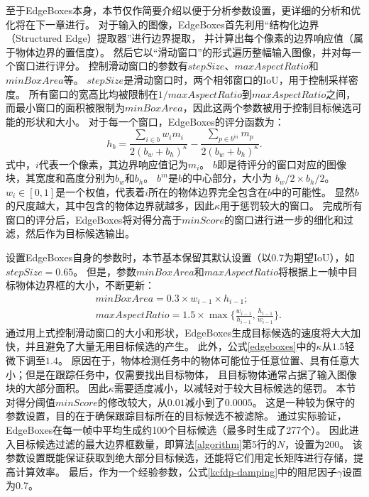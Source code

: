 至于EdgeBoxes本身，本节仅作简要介绍以便于分析参数设置，更详细的分析和优化将在下一章进行。
对于输入的图像，EdgeBoxes首先利用``结构化边界（Structured Edge）提取器''进行边界提取，
并计算出每个像素的边界响应值（属于物体边界的置信度）。
然后它以``滑动窗口''的形式遍历整幅输入图像，并对每一个窗口进行评分。
控制滑动窗口的参数有$stepSize$、$maxAspectRatio$和$minBoxArea$等。
$stepSize$是滑动窗口时，两个相邻窗口的IoU，用于控制采样密度。
所有窗口的宽高比均被限制在$1/maxAspectRatio$到$maxAspectRatio$之间，
而最小窗口的面积被限制为$minBoxArea$，因此这两个参数被用于控制目标候选可能的形状和大小。
对于每一个窗口，EdgeBoxes的评分函数为：
\begin{equation}
	h_b = \frac{\sum_{i\in b}w_{i}m_i}{2(b_w+b_h)^\kappa} - \frac{\sum_{p\in b^{in}}m_p}{2(b_w+b_h)^\kappa}. \label{edgeboxes}
\end{equation}
式中，$i$代表一个像素，其边界响应值记为$m_i$。
$b$即是待评分的窗口对应的图像块，其宽度和高度分别为$b_w$和$b_h$。
$b^{in}$是$b$的中心部分，大小为 ${b_w}/{2}\times {b_h}/{2}$。
$w_{i}\in [0,1]$是一个权值，代表着$i$所在的物体边界完全包含在$b$中的可能性。
显然$b$的尺度越大，其中包含的物体边界就越多，因此$\kappa$用于惩罚较大的窗口。
完成所有窗口的评分后，EdgeBoxes将对得分高于$minScore$的窗口进行进一步的细化和过滤，然后作为目标候选输出。

设置EdgeBoxes自身的参数时，本节基本保留其默认设置（以0.7为期望IoU），如$stepSize=0.65$。
但是，参数$minBoxArea$和$maxAspectRatio$将根据上一帧中目标物体边界框的大小，不断更新：
\begin{equation}
\begin{aligned}
	&minBoxArea=0.3\times w_{i-1}\times h_{i-1};\\
	&maxAspectRatio=1.5\times \max\{\frac{w_{i-1}}{h_{i-1}},\frac{h_{i-1}}{w_{i-1}}\}.
	\label{EBfactor}
\end{aligned}
\end{equation}
通过用上式控制滑动窗口的大小和形状，EdgeBoxes生成目标候选的速度将大大加快，并且避免了大量无用目标候选的产生。
此外，公式\ref{edgeboxes}中的$\kappa$从$1.5$轻微下调至$1.4$。
原因在于，物体检测任务中的物体可能位于任意位置、具有任意大小；但是在跟踪任务中，仅需要找出目标物体，
且目标物体通常占据了输入图像块的大部分面积。
因此$\kappa$需要适度减小，以减轻对于较大目标候选的惩罚。
本节对得分阈值$minScore$的修改较大，从$0.01$减小到了$0.0005$。
这是一种较为保守的参数设置，目的在于确保跟踪目标所在的目标候选不被滤除。
通过实际验证，EdgeBoxes在每一帧中平均生成约100个目标候选（最多时生成了277个）。
因此进入目标候选过滤的最大边界框数量，即算法\ref{algorithm}第5行的$N$，设置为200。
该参数设置既能保证获取到绝大部分目标候选，还能将它们用定长矩阵进行存储，提高计算效率。
最后，作为一个经验参数，公式\ref{kcfdp-damping}中的阻尼因子$\gamma$设置为0.7。

